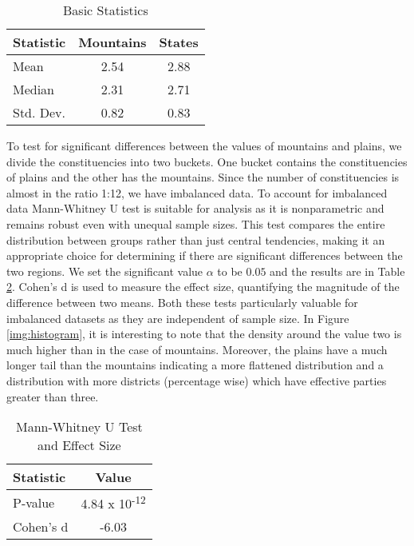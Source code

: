     \label{img:histogram}

\begin{table}[h]
\centering
\begin{tabular}{|l|c|c|}
\hline
Statistic & Mountains & States \\
\hline
Mean & 2.54 & 2.88 \\
Median & 2.31 & 2.71 \\
Std. Dev. & 0.82 & 0.83 \\
\hline
\end{tabular}
\caption{Basic Statistics}

\label{tab:basic_stats}
\end{table}

To test for significant differences between the values of mountains and plains, we divide the constituencies into two buckets. One bucket contains the constituencies of plains and the other has the mountains. Since the number of constituencies is almost in the ratio 1:12, we have imbalanced data. To account for imbalanced data Mann-Whitney U test is suitable for analysis as it is nonparametric and remains robust even with unequal sample sizes. This test compares the entire distribution between groups rather than just central tendencies, making it an appropriate choice for determining if there are significant differences between the two regions. We set the significant value $\alpha$ to be $0.05$ and the results are in Table \ref{tab:stats_tests}. Cohen's d is used to measure the effect size, quantifying the magnitude of the difference between two means. Both these tests particularly valuable for imbalanced datasets as they are independent of sample size. In Figure \ref{img:histogram}, it is interesting to note that the density around the value two is much higher than in the case of mountains. Moreover, the plains have a much longer tail than the mountains indicating a more flattened distribution and a distribution with more districts (percentage wise) which have effective parties greater than three. 

\begin{table}[h]
\centering
\begin{tabular}{|l|c|}
\hline
Statistic & Value \\
\hline
P-value & 4.84 x 10\textsuperscript{-12} \\
Cohen's d & -6.03 \\
\hline
\end{tabular}
\label{tab:stats_tests}
\caption{Mann-Whitney U Test and Effect Size}

\end{table}


